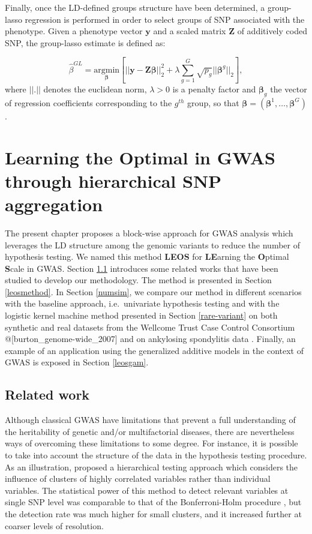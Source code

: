 \documentclass[]{book}
\begin{document}
Finally, once the LD-defined groups structure have been determined, a
group-lasso regression is performed in order to select groups of SNP
associated with the phenotype. Given a phenotype vector \(\mathbf{y}\) and a
scaled matrix \(\mathbf{Z}\) of additively coded SNP, the group-lasso estimate is
defined as:

\[\hat{\beta}^{GL} = \underset{\boldsymbol{\beta}}{\text{argmin}} \left[ ||\mathbf{y} - \mathbf{Z}\boldsymbol{\beta}||^2_2 + \lambda \sum_{g=1}^G \sqrt{p_g}||\boldsymbol{\beta}^g||_2  \right],\]
where \(||.||\) denotes the euclidean norm, \(\lambda > 0\) is a penalty
factor and \(\boldsymbol{\beta}_g\) the vector of regression coefficients
corresponding to the \(g^{th}\) group, so that
\(\boldsymbol{\beta} = (\boldsymbol{\beta}^1,\dots,\boldsymbol{\beta}^G)\).

\hypertarget{LEOS}{%
\chapter{Learning the Optimal in GWAS through hierarchical SNP aggregation}\label{LEOS}}

The present chapter proposes a block-wise approach for GWAS analysis which leverages the LD structure among the genomic variants to reduce the number of hypothesis testing. We named this method \textbf{LEOS} for \textbf{LE}arning the \textbf{O}ptimal \textbf{S}cale in GWAS. Section \ref{introleos} introduces some related works that have been studied to develop our methodology. The method is presented in Section \ref{leosmethod}. In Section \ref{numsim}, we compare our method in different scenarios with the baseline approach, i.e.~univariate hypothesis testing \citep{purcell_2007_plink} and with the logistic kernel machine method presented in Section \ref{rare-variant} on both synthetic and real datasets from the Wellcome Trust Case Control Consortium @{[}burton\_genome-wide\_2007{]} and on ankylosing spondylitis data \citep{IGAS_2013_identification}. Finally, an example of an application using the generalized additive models in the context of GWAS is exposed in Section \ref{leosgam}.

\hypertarget{introleos}{%
\section{Related work}\label{introleos}}

Although classical GWAS have limitations that prevent a full
understanding of the heritability of genetic and/or multifactorial
diseases, there are nevertheless ways of overcoming these limitations to
some degree. For instance, it is possible to take into account the
structure of the data in the hypothesis testing procedure. As an
illustration, \citep{meinshausen_hierarchical_2008} proposed a hierarchical
testing approach which considers the influence of clusters of highly
correlated variables rather than individual variables. The statistical
power of this method to detect relevant variables at single SNP level
was comparable to that of the Bonferroni-Holm procedure
\citep{Holm_Bonferroni}, but the detection rate was much higher for small
clusters, and it increased further at coarser levels of resolution.
\end{document}
